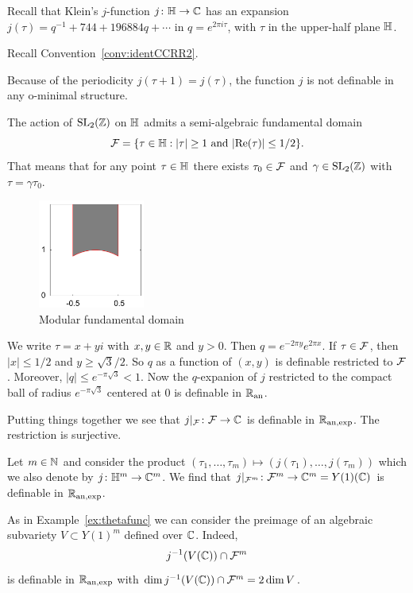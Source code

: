 \begin{example}
  Recall that Klein's $j$-function $j\colon {\mathbb{H}}\rightarrow{\mathbb{C}}$ has an
  expansion $j(\tau)=q^{-1}+744+196884q+\cdots$
  in $q = e^{2\pi i \tau}$, with $\tau$ in the upper-half plane ${\mathbb{H}}$.

  Recall Convention~\ref{conv:identCCRR2}.
  
  Because of the periodicity $j(\tau+1)=j(\tau)$, the function
  $j$ is not definable in any o-minimal structure.

  The action of $\mathrm{SL}_2({\mathbb{Z}})$ on ${\mathbb{H}}$ admits a semi-algebraic
  fundamental domain %
  \begin{equation*}
    {\mathcal F} = \{ \tau\in {\mathbb{H}}: |\tau|\ge 1 \text{ and
    }|\mathrm{Re}(\tau)|\le 1/2\}.
  \end{equation*}
  That means that 
  for any point $\tau\in{\mathbb{H}}$ there exists $\tau_0\in {\mathcal F}$ and
  $\gamma\in \mathrm{SL}_2({\mathbb{Z}})$ with $\tau=\gamma\tau_0$.
  
  \begin{figure}
    \label{fig:modfd}
    \centering
    \includegraphics[width=3.5cm]{fd.png}
    \caption{Modular fundamental domain}
  \end{figure}

  We write $\tau = x+yi$ with $x,y\in{\mathbb{R}}$ and $y>0$.
  Then $q=e^{-2\pi y} e^{2\pi x}$.
  If $\tau\in {\mathcal F}$, then $|x|\le 1/2$ and $y\ge \sqrt{3}/2$.
  So $q$ as a function of $(x,y)$ is definable restricted to
  ${\mathcal F}$. Moreover, $|q|\le e^{-\pi\sqrt{3}}< 1$. Now
  the $q$-expanion of $j$ restricted to the compact ball of radius
  $e^{-\pi\sqrt{3}}$ centered at $0$ is definable in ${{\mathbb{R}}_{\mathrm{an}}}$.

  Putting things together we see that $j|_{{\mathcal F}}\colon
  {\mathcal F}\rightarrow{\mathbb{C}}$ is definable in ${{\mathbb{R}}_{\mathrm{an,exp}}}$. The restriction is
  surjective.

  Let $m\in{\mathbb{N}}$ and consider the product $(\tau_1,\ldots,\tau_m)\mapsto
  (j(\tau_1),\ldots,j(\tau_m))$ which we also denote by
  $j\colon{\mathbb{H}}^m\rightarrow{\mathbb{C}}^m$. We find that
  $j|_{{\mathcal F}^m}\colon {\mathcal F}^m\rightarrow{\mathbb{C}}^m=Y(1)({\mathbb{C}})$ is definable in ${{\mathbb{R}}_{\mathrm{an,exp}}}$.

  As in Example~\ref{ex:thetafunc} we can consider the preimage of an
  algebraic subvariety $V\subset Y(1)^m$ defined over ${\mathbb{C}}$.
  Indeed,
  \begin{equation*}
    j^{-1}(V({\mathbb{C}})) \cap {\mathcal F}^m
  \end{equation*}
  is definable in ${{\mathbb{R}}_{\mathrm{an,exp}}}$ with $\dim j^{-1}(V({\mathbb{C}}))\cap {\mathcal F}^m =
  2\dim V$.  
\end{example}

